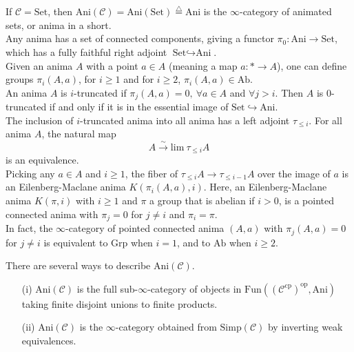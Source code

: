 \documentclass[UTF8,12,a4paper]{ctexart}
\theoremstyle{definition}
\begin{document}
\exm 
If $\mathcal{C}=\text{Set}$, then $\text{Ani}(\mathcal{C})=\text{Ani}(\text{Set})\stackrel{\triangle}{=}\text{Ani}$ is the $\infty$-category of animated sets, or anima in a short.\\
Any anima has a set of connected components, giving a functor $\pi_0:\text{Ani}\rightarrow\text{Set}$, which has a fully faithful right adjoint $\text{Set}\hookrightarrow\text{Ani}$.\\
Given an anima $A$ with a point $a\in A$ (meaning a map $a:*\to A$), one can define groups $\pi_i(A,a)$, for $i\geq 1$ and for $i\geq 2$, $\pi_i(A,a)\in\text{Ab}$.\\
An anima $A$ is $i$-truncated if $\pi_j(A,a)=0,\ \forall a\in A$ and $\forall j>i$. Then $A$ is 0-truncated if and only if it is in the essential image of $\text{Set}\hookrightarrow \text{Ani}.$\\
The inclusion of $i$-truncated anima into all anima has a left adjoint $\tau_{\leq i}.$ For all anima $A$, the natural map 
$$A\stackrel{\sim}{\longrightarrow} \text{lim}\ \tau_{\leq i}A$$ 
is an equivalence.\\
Picking any $a\in A$ and $i\geq 1$, the fiber of $\tau_{\leq i}A\rightarrow \tau_{\leq i-1}A$ over the image of $a$ is an Eilenberg-Maclane anima $K(\pi_i(A,a),i).$ Here, an Eilenberg-Maclane anima $K(\pi, i)$ with $i\geq 1$ and $\pi$ a group that is abelian if $i>0$, is a pointed connected anima with $\pi_j=0$ for $j\neq i$ and $\pi_i=\pi.$\\
In fact, the $\infty$-category of pointed connected anima $(A,a)$ with $\pi_j(A,a)=0$ for $j\neq i$ is equivalent to $\text{Grp}$ when $i=1$, and to $\text{Ab}$ when $i\geq 2.$

\rem 
There are several ways to describe $\text{Ani}(\mathcal{C}).$
\begin{itemize}
	\item [(i)] $\text{Ani}(\mathcal{C})$ is the full sub-$\infty$-category of objects in  $\text{Fun}((\mathcal{C}^\text{cp})^\text{op},\text{Ani})$
	taking finite disjoint unions to finite products.
	\item [(ii)] $\text{Ani}(\mathcal{C})$ is the $\infty$-category obtained from $\text{Simp}(\mathcal{C})$ by inverting weak equivalences.
\end{itemize}
\end{document}

